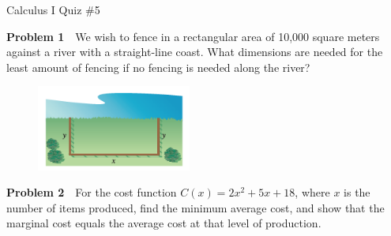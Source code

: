 \documentclass[10pt]{article}
\begin{document}


\begin{center}
Calculus I Quiz \#5
\end{center}



\noindent\textbf{Problem 1} \,\, We wish to fence in a rectangular area of 10,000 square meters against a river with a straight-line coast. What dimensions are needed for the least amount of fencing if no fencing is needed along the river?

\begin{figure}[!ht]
    \includegraphics[width=2in]{fencing.png}
\end{figure}

\vspace{70mm}

\noindent\textbf{Problem 2} \,\, For the cost function $C(x) = 2x^2 + 5x + 18$, where $x$ is the number of items produced, find the minimum average cost, and show that the marginal cost equals the average cost at that level of production. 
\end{document}

